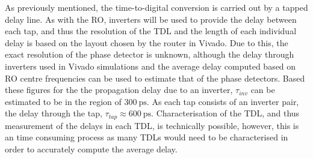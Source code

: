 As previously mentioned, the time-to-digital conversion is carried out by a tapped delay line. As with the \ac{RO}, inverters will be used to provide the delay between each tap, and thus the resolution of the \ac{TDL} and the length of each individual delay is based on the layout chosen by the router in Vivado. Due to this, the exact resolution of the phase detector is unknown, although the delay through inverters used in Vivado simulations and the average delay computed based on \ac{RO} centre frequencies can be used to estimate that of the phase detectors. Based these figures for the the propagation delay due to an inverter, $\tau_{inv}$ can be estimated to be in the region of $300~\si{\pico\second}$. As each tap consists of an inverter pair, the delay through the tap, $\tau_{tap} \approx 600~\si{\pico\second}$. Characterisation of the \ac{TDL}, and thus measurement of the delays in each \ac{TDL}, is technically possible, however, this is an time consuming process as many \ac{TDL}s would need to be characterised in order to accurately compute the average delay. 

